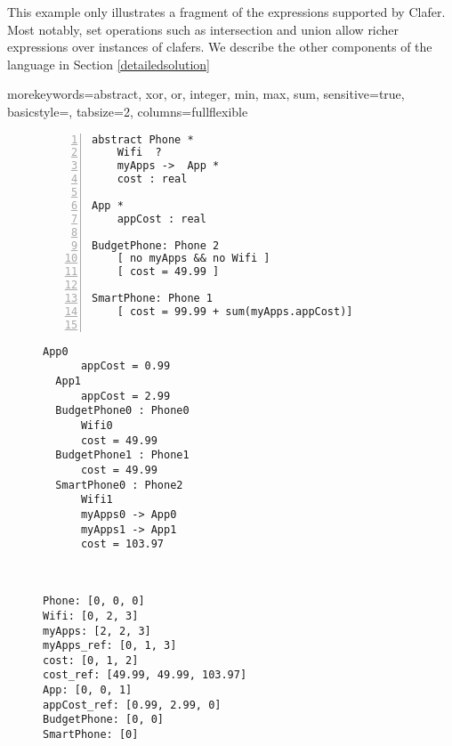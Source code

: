 \documentclass{easychair}
\begin{document}
\indent This example only illustrates a fragment of the expressions supported by Clafer. Most notably, set operations such as intersection and union allow richer expressions over instances of clafers. We describe the other components of the language in Section \ref{detailedsolution}

{morekeywords={abstract, xor, or, integer, min, max, sum},
sensitive=true,
basicstyle={\sffamily\small},
tabsize=2,
columns=fullflexible
}


\begin{figure}[!t]
\par\noindent
\begin{minipage}[t]{.33\textwidth}
\begin{lstlisting}[language=clafer, numbers=left, caption=Clafer specification of two types of phones and apps., label={listing:ClaferPhone}]
abstract Phone *
	Wifi  ?
	myApps ->  App *
	cost : real

App *
	appCost : real

BudgetPhone: Phone 2
	[ no myApps && no Wifi ]
	[ cost = 49.99 ]	

SmartPhone: Phone 1
	[ cost = 99.99 + sum(myApps.appCost)]	
 
\end{lstlisting}%
\end{minipage}%
\hfill
\begin{minipage}[t]{.32\textwidth}
\begin{lstlisting}[language=clafer, caption=A generated model of a mobile phone and its apps in Clafer., label={listing:ClaferPhoneInstance}]
  App0
	  appCost = 0.99
  App1
	  appCost = 2.99
  BudgetPhone0 : Phone0
	  Wifi0
	  cost = 49.99
  BudgetPhone1 : Phone1
  	  cost = 49.99
  SmartPhone0 : Phone2
	  Wifi1
	  myApps0 -> App0
	  myApps1 -> App1
	  cost = 103.97
\end{lstlisting}%
\end{minipage}%
\hfill
\begin{minipage}[t]{.32\textwidth}
\begin{lstlisting}[language=clafer, caption=The variables associated with each clafer in Z3\, corresponding to Listing 2., label={listing:ClaferPhoneZ3}]


Phone: [0, 0, 0]
Wifi: [0, 2, 3]
myApps: [2, 2, 3]
myApps_ref: [0, 1, 3]
cost: [0, 1, 2]
cost_ref: [49.99, 49.99, 103.97]
App: [0, 0, 1]
appCost_ref: [0.99, 2.99, 0]
BudgetPhone: [0, 0]
SmartPhone: [0]
\end{lstlisting}%
\end{minipage}%
\end{figure}
\end{document}
